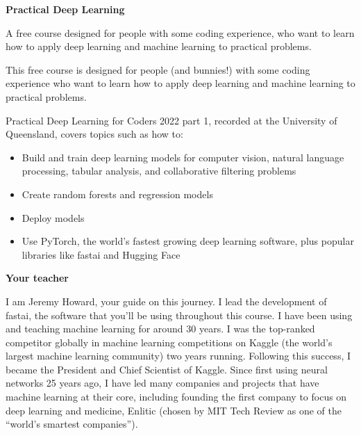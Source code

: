 		\noindent\textbf{Practical Deep Learning}
		
		A free course designed for people with some coding experience, who want to learn how to apply deep learning and machine learning to practical problems.
		
		This free course is designed for people (and bunnies!) with some coding experience who want to learn how to apply deep learning and machine learning to practical problems.\newline
		
		\noindent Practical Deep Learning for Coders 2022 part 1, recorded at the University of Queensland, covers topics such as how to:
		\begin{itemize}
			\item Build and train deep learning models for computer vision, natural language processing, tabular analysis, and collaborative filtering problems
			\item Create random forests and regression models
			\item Deploy models
			\item Use PyTorch, the world’s fastest growing deep learning software, plus popular libraries like fastai and Hugging Face
		\end{itemize}
		
		
		
		\noindent\textbf{Your teacher}
		
		I am Jeremy Howard, your guide on this journey. I lead the development of fastai, the software that you’ll be using throughout this course. I have been using and teaching machine learning for around 30 years. I was the top-ranked competitor globally in machine learning competitions on Kaggle (the world’s largest machine learning community) two years running. Following this success, I became the President and Chief Scientist of Kaggle. Since first using neural networks 25 years ago, I have led many companies and projects that have machine learning at their core, including founding the first company to focus on deep learning and medicine, Enlitic (chosen by MIT Tech Review as one of the “world’s smartest companies”).
		
